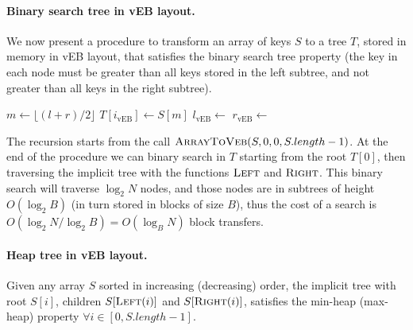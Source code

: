 \paragraph{Binary search tree in vEB layout.} We now present a procedure to transform an array of keys $S$ to a tree $T$, stored in memory in vEB layout, that satisfies the binary search tree property (the key in each node must be greater than all keys stored in the left subtree, and not greater than all keys in the right subtree).
\begin{algorithmic}[1]
	\State \Return{}
	\EndIf
	\State $m \gets \lfloor (l+r)/2 \rfloor$
	\State $T[i_{\text{vEB}}] \gets S[m]$ 
	\State $l_{\text{vEB}} \gets $ 
	\State $r_{\text{vEB}} \gets $ 
	\State {}
	\State {}
	\EndFunction
\end{algorithmic}
The recursion starts from the call $\textsc{ArrayToVeb}(S, 0, 0, S.length-1)$. At the end of the procedure we can binary search in $T$ starting from the root $T[0]$, then traversing the implicit tree with the functions $\textsc{Left}$ and $\textsc{Right}$. This binary search will traverse $\log_2 N$ nodes, and those nodes are in subtrees of height $O(\log_2 B)$ (in turn stored in blocks of size $B$), thus the cost of a search is $O(\log_2 N / \log_2 B)=O(\log_B N)$ block transfers.

\paragraph{Heap tree in vEB layout.}  Given any array $S$ sorted in increasing (decreasing) order, the implicit tree with root $S[i]$, children $S[\textsc{Left}(i)]$ and $S[\textsc{Right}(i)]$, satisfies the min-heap (max-heap) property $\forall i \in [0, S.length-1]$.